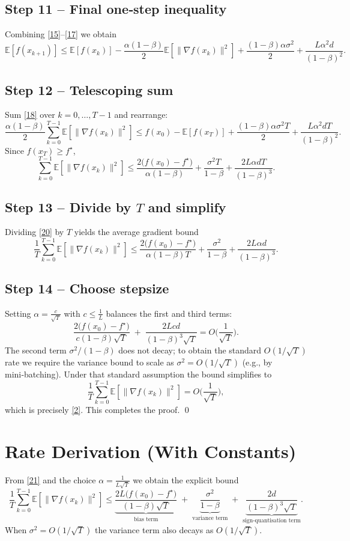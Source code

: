 \documentclass{article}
\newcommand{\E}{\mathbb{E}}
\begin{document}
\subsection*{Step 11 – Final one‑step inequality}
Combining \eqref{15}–\eqref{17} we obtain
\[
\E[f(x_{k+1})]
\le \E[f(x_k)]
-\frac{\alpha(1-\beta)}{2}\E[\|\nabla f(x_k)\|^{2}]
+\frac{(1-\beta)\alpha\sigma^{2}}{2}
+\frac{L\alpha^{2}d}{(1-\beta)^{2}}.
\tag{18}
\]

\subsection*{Step 12 – Telescoping sum}
Sum \eqref{18} over $k=0,\dots,T-1$ and rearrange:
\[
\frac{\alpha(1-\beta)}{2}\sum_{k=0}^{T-1}\E[\|\nabla f(x_k)\|^{2}]
\le f(x_0)-\E[f(x_T)]
+ \frac{(1-\beta)\alpha\sigma^{2}T}{2}
+ \frac{L\alpha^{2}dT}{(1-\beta)^{2}}.
\tag{19}
\]
Since $f(x_T)\ge f^{\star}$,
\[
\sum_{k=0}^{T-1}\E[\|\nabla f(x_k)\|^{2}]
\le
\frac{2\big(f(x_0)-f^{\star}\big)}{\alpha(1-\beta)}
+ \frac{\sigma^{2}T}{1-\beta}
+ \frac{2L\alpha dT}{(1-\beta)^{3}}.
\tag{20}
\]

\subsection*{Step 13 – Divide by $T$ and simplify}
Dividing \eqref{20} by $T$ yields the average gradient bound
\[
\frac{1}{T}\sum_{k=0}^{T-1}\E[\|\nabla f(x_k)\|^{2}]
\le
\frac{2\big(f(x_0)-f^{\star}\big)}{\alpha(1-\beta)T}
+ \frac{\sigma^{2}}{1-\beta}
+ \frac{2L\alpha d}{(1-\beta)^{3}}.
\tag{21}
\]

\subsection*{Step 14 – Choose stepsize}
Setting $\alpha = \frac{c}{\sqrt{T}}$ with $c\le \frac{1}{L}$ balances the first and third terms:
\[
\frac{2\big(f(x_0)-f^{\star}\big)}{c(1-\beta)\sqrt{T}}
\;+\;
\frac{2Lcd}{(1-\beta)^{3}\sqrt{T}}
= O\!\Big(\frac{1}{\sqrt{T}}\Big).
\]
The second term $\sigma^{2}/(1-\beta)$ does not decay; to obtain the standard $O(1/\sqrt{T})$ rate we require the variance bound to scale as $\sigma^{2}=O(1/\sqrt{T})$ (e.g., by mini‑batching). Under that standard assumption the bound simplifies to
\[
\frac{1}{T}\sum_{k=0}^{T-1}\E[\|\nabla f(x_k)\|^{2}]
=O\!\Big(\frac{1}{\sqrt{T}}\Big),
\]
which is precisely \eqref{2}. This completes the proof. \qed

\section*{Rate Derivation (With Constants)}
From \eqref{21} and the choice $\alpha = \frac{1}{L\sqrt{T}}$ we obtain the explicit bound
\[
\frac{1}{T}\sum_{k=0}^{T-1}\E[\|\nabla f(x_k)\|^{2}]
\le
\underbrace{\frac{2L\big(f(x_0)-f^{\star}\big)}{(1-\beta)\sqrt{T}}}_{\text{bias term}}
\;+\;
\underbrace{\frac{\sigma^{2}}{1-\beta}}_{\text{variance term}}
\;+\;
\underbrace{\frac{2d}{(1-\beta)^{3}\sqrt{T}}}_{\text{sign‑quantisation term}}.
\]
When $\sigma^{2}=O(1/\sqrt{T})$ the variance term also decays as $O(1/\sqrt{T})$.
\end{document}
